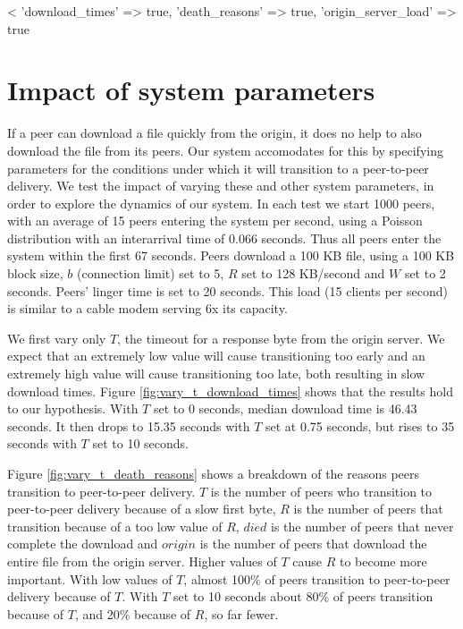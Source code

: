 <%
   {'download_times' => true, 'death_reasons' => true, 'origin_server_load' => true} %

\section{Impact of system parameters}

If a peer can download a file quickly from the origin, it does no help to also download the file from its
peers. Our system accomodates for this by specifying parameters for the conditions under which it will 
transition to a peer-to-peer delivery. We test the impact of varying these and other system parameters, in order 
to explore the dynamics of our system. In each test we start 1000 peers, with an average of 15 peers entering 
the system per second, using a Poisson distribution with an interarrival time of 0.066 seconds.  Thus all peers enter the system within the first 67 seconds. 
Peers download a 100 KB file, using a 100 KB block size, $b$ (connection limit) set to 5, $R$ set to 128 KB/second and $W$ set to 2 seconds.
Peers' linger time is set to 20 seconds.  This load (15 clients per second) is similar to a cable modem serving 6x its capacity.

We first vary only $T$, the timeout for a response byte from the origin server. We expect that an extremely low value 
will cause transitioning too early and an extremely high value 
will cause transitioning too late, both resulting in slow download times. Figure \ref{fig:vary_t_download_times} shows that 
the results hold to our hypothesis. With $T$ set to 0 seconds, median download time is 46.43 seconds. It then drops to 15.35 seconds with $T$ set at 0.75 seconds, 
but rises to 35 seconds with $T$ set to 10 seconds.

Figure \ref{fig:vary_t_death_reasons} shows a breakdown of the reasons peers transition to peer-to-peer delivery.  $T$ is the number
of peers who transition to peer-to-peer delivery because of a slow first byte, $R$ is the number of
peers that transition because of a too low value of $R$, $died$ is the number of peers that never complete the download and $origin$ is the number of peers
that download the entire file from the origin server.
Higher values of $T$ cause $R$ to become more important.  With low values of $T$, almost 100\% of peers transition to peer-to-peer delivery because of $T$. 
With $T$ set to 10 seconds about 80\% of peers transition because of $T$, and 20\% because of $R$, so far fewer.

